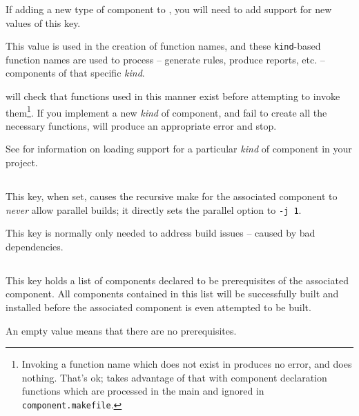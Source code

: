 If adding a new type of component to \lmsbw, you will need to add
support for new values of this key.

This value is used in the creation of function names, and these
\texttt{kind}-based function names are used to process -- generate
rules, produce reports, etc. -- components of that specific
\emph{kind}.

\lmsbw will check that functions used in this manner exist before
attempting to invoke them\footnote{Invoking a function name which does
  not exist in \gnumake produces no error, and does nothing.  That's
  ok; \lmsbw takes advantage of that with component declaration
  functions which are processed in the main \makefile and ignored in
  \texttt{component.makefile}.}.  If you implement a new \emph{kind}
of component, and fail to create all the necessary functions, \lmsbw
will produce an appropriate error and stop.

See  for information on
loading support for a particular \emph{kind} of component in your
project.


\subsection{}\label{variables:no-parallel}

This key, when set, causes the recursive make for the associated
component to \emph{never} allow parallel builds; it directly sets the
\gnumake parallel option to \texttt{-j 1}.

This key is normally only needed to address build issues -- caused by
bad dependencies.


\subsection{}\label{variables:prerequisite}

This key holds a list of components declared to be prerequisites of
the associated component.  All components contained in this list will
be successfully built and installed before the associated component is
even attempted to be built.

An empty value means that there are no prerequisites.


